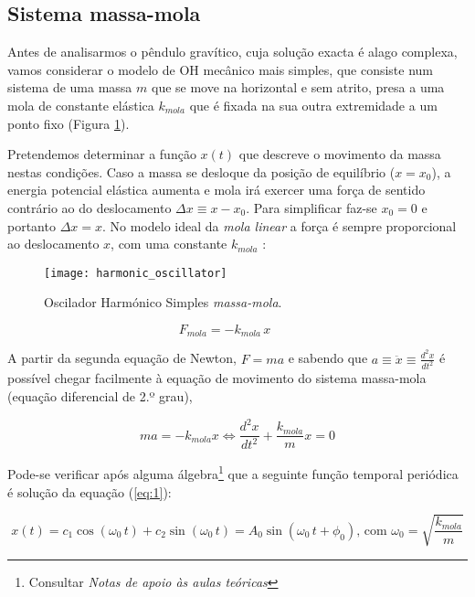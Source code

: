 \documentclass[a4paper,twoside,12pt]{article}      %
\begin{document}
\subsection{\sf Sistema massa-mola}
Antes de analisarmos o pêndulo gravítico, cuja solução exacta é alago complexa, vamos considerar o modelo de OH mecânico mais simples, que consiste num sistema de uma massa $m$ que se 
move na horizontal e sem atrito,  presa a uma mola de constante elástica $k_{mola}$ que é fixada na sua outra extremidade a um ponto fixo (Figura \ref{fig:2}). 

Pretendemos determinar a função $x(t)$ que descreve o movimento da massa nestas condições. Caso a massa se desloque da posição de equilíbrio ($x =x_0$), a energia potencial elástica aumenta e mola irá exercer uma força de sentido contrário ao do deslocamento $\Delta x \equiv x - x_0$. 
Para simplificar faz-se $x_0=0$ e portanto $\Delta x = x$.
 No modelo ideal da \emph{ mola linear} a força é sempre proporcional ao deslocamento $x$, com uma constante $k_{mola}$ :

\begin{figure}
	[b] \centering 
	\texttt{[image: harmonic\_oscillator]} 
	\caption{Oscilador Harmónico Simples \emph{massa-mola}.  \label{fig:2}} 
\end{figure}

\begin{equation}
F_{mola} = - k_{mola} \, x \qquad 
\end{equation}

A partir da segunda equação de Newton, $F=m a$ e sabendo que $ a \equiv  \ddot{x} \equiv  \frac{d^2 x}{dt^2}$ é possível chegar facilmente  à equação de movimento do sistema massa-mola (equação diferencial de 2.º grau),

\begin{equation}
	\label{eq:1} 
 m a = - k_{mola} x \Leftrightarrow \frac{d^2 x}{dt^2}  + \frac{k_{mola}}{m} x = 0
\end{equation}

Pode-se verificar após alguma álgebra\footnote{Consultar \emph{Notas de apoio às aulas teóricas}} que a seguinte função temporal periódica é solução da equação (\ref{eq:1}):

\begin{equation}
	\label{eq:solu_mola}
x(t) = c_1 \cos(\omega_0 \, t) + c_2 \sin(\omega_0 \, t) = A_0 \sin(\omega_0 \, t + \phi_0) \text{, com } \omega_0 = \sqrt{\frac{k_{mola}}{m}}
\end{equation}
\end{document}
